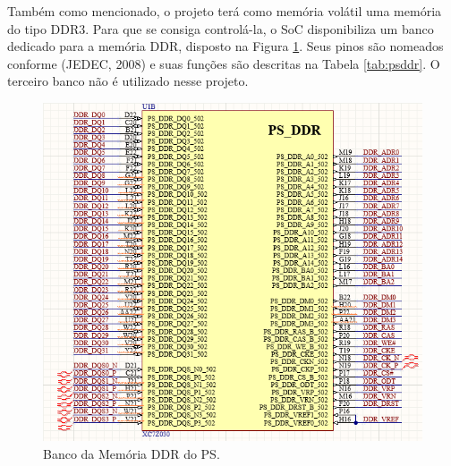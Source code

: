 Também como mencionado, o projeto terá como memória volátil uma memória do tipo DDR3. Para que se consiga controlá-la, o SoC disponibiliza um banco dedicado para a memória DDR, disposto na  Figura \ref{fig:psddr}. Seus pinos são nomeados conforme (JEDEC, 2008) e suas funções são descritas na Tabela \ref{tab:psddr}. O terceiro banco não é utilizado nesse projeto.

\begin{figure}[H]
    \centering
    \includegraphics[scale=0.7]{images/psddr.png}
    \caption{Banco da Memória DDR do PS.}
    \label{fig:psddr}
\end{figure}

